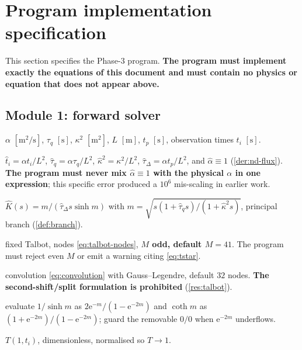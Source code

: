 \documentclass[11pt,a4paper]{article}
\theoremstyle{definition}
\newcommand{\tq}{\tau_{q}}
\newcommand{\kk}{\kappa^{2}}
\newcommand{\Lap}[1]{\hat{#1}}
\begin{document}
\section{Program implementation specification}
\label{sec:program}

This section specifies the Phase-3 program. \textbf{The program must implement
exactly the equations of this document and must contain no physics or equation
that does not appear above.}

\subsection{Module 1: forward solver}

\begin{description}[nosep,style=nextline]
\item[Inputs] $\alpha$ $[\si{\metre\squared\per\second}]$,
  $\tq$ $[\si{\second}]$, $\kk$ $[\si{\metre\squared}]$,
  $L$ $[\si{\metre}]$, $t_{p}$ $[\si{\second}]$,
  observation times $t_{i}$ $[\si{\second}]$.
\item[Internal scaling] $\hat t_{i}=\alpha t_{i}/L^{2}$,
  $\hat\tau_{q}=\alpha\tq/L^{2}$, $\hat\kappa^{2}=\kk/L^{2}$,
  $\hat\tau_{\Delta}=\alpha t_{p}/L^{2}$, and $\hat\alpha\equiv1$
  (\cref{der:nd-flux}). \textbf{The program must never mix
  $\hat\alpha\equiv1$ with the physical $\alpha$ in one expression};
  this specific error produced a $10^{6}$ mis-scaling in earlier work.
\item[Kernel] $\Lap K(s)=m/(\hat\tau_{\Delta}s\sinh m)$ with
  $m=\sqrt{s(1+\hat\tau_{q}s)/(1+\hat\kappa^{2}s)}$, principal branch
  (\cref{def:branch}).
\item[Inversion] fixed Talbot, nodes \eqref{eq:talbot-nodes},
  \textbf{$M$ odd, default $M=41$}. The program must reject even $M$ or emit a
  warning citing \eqref{eq:tstar}.
\item[Pulse handling] convolution \eqref{eq:convolution} with Gauss--Legendre,
  default $32$ nodes. \textbf{The second-shift/split formulation is
  prohibited} (\cref{res:talbot}).
\item[Overflow guards] evaluate $1/\sinh m$ as
  $2\mathrm{e}^{-m}/(1-\mathrm{e}^{-2m})$ and $\coth m$ as
  $(1+\mathrm{e}^{-2m})/(1-\mathrm{e}^{-2m})$; guard the removable $0/0$ when
  $\mathrm{e}^{-2m}$ underflows.
\item[Output] $T(1,t_{i})$, dimensionless, normalised so $T\to1$.
\end{description}
\end{document}
